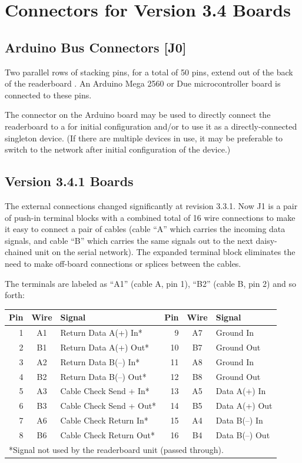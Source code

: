 \section{Connectors for Version 3.4 Boards}
\subsection{Arduino Bus Connectors [J0]}
Two parallel rows of stacking pins, for a total of 50 pins, extend out of the back of the readerboard .
An Arduino Mega 2560 or Due microcontroller board is connected to these pins.

The  connector on the Arduino board may be used to directly connect the readerboard to a 
for initial configuration and/or to use it as a directly-connected singleton device. (If there are multiple
devices in use, it may be preferable to switch to the  network after initial configuration of the
device.)

\subsection{Version 3.4.1 Boards}
The external connections changed significantly at revision 3.3.1. Now J1 is a pair of push-in terminal
blocks with a combined total of 16 wire connections to make it easy to connect a pair of  cables
(cable ``A'' which carries the incoming data signals, and cable ``B'' which carries the same signals out to
the next daisy-chained unit on the  serial network). The expanded terminal block eliminates the
need to make off-board connections or splices between the cables.

The terminals are labeled as ``A1'' (cable A, pin 1), ``B2'' (cable B, pin 2) and so forth:
\begin{center}
	\begin{tabular}{rcl|rcl}\toprule
		\bfseries Pin & \bfseries Wire & \bfseries Signal &
		\bfseries Pin & \bfseries Wire & \bfseries Signal \\\midrule
		1&A1&Return Data A(+) In*   & 9&A7&Ground In\\
		2&B1&Return Data A(+) Out*  &10&B7&Ground Out\\
		3&A2&Return Data B(--) In*  &11&A8&Ground In\\
		4&B2&Return Data B(--) Out* &12&B8&Ground Out\\
		5&A3&Cable Check Send + In* &13&A5&Data A(+) In\\
		6&B3&Cable Check Send + Out*&14&B5&Data A(+) Out\\
		7&A6&Cable Check Return In* &15&A4&Data B(--) In\\
		8&B6&Cable Check Return Out*&16&B4&Data B(--) Out\\
		\bottomrule
		\multicolumn{6}{l}{*Signal not used by the readerboard unit (passed through).}
	\end{tabular}
\end{center}

